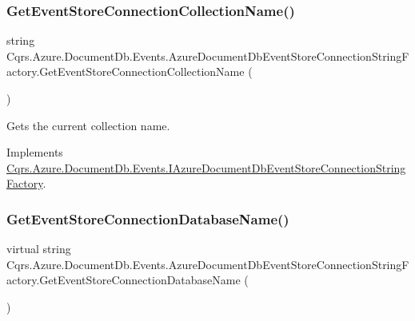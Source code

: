\subsubsection{\texorpdfstring{Get\+Event\+Store\+Connection\+Collection\+Name()}{GetEventStoreConnectionCollectionName()}}
{\footnotesize\ttfamily string Cqrs.\+Azure.\+Document\+Db.\+Events.\+Azure\+Document\+Db\+Event\+Store\+Connection\+String\+Factory.\+Get\+Event\+Store\+Connection\+Collection\+Name (\begin{DoxyParamCaption}{ }\end{DoxyParamCaption})}



Gets the current collection name. 



Implements \hyperlink{interfaceCqrs_1_1Azure_1_1DocumentDb_1_1Events_1_1IAzureDocumentDbEventStoreConnectionStringFactory_a4268ad0884bad88528a5eb10292d9d3b_a4268ad0884bad88528a5eb10292d9d3b}{Cqrs.\+Azure.\+Document\+Db.\+Events.\+I\+Azure\+Document\+Db\+Event\+Store\+Connection\+String\+Factory}.

\mbox{\label{classCqrs_1_1Azure_1_1DocumentDb_1_1Events_1_1AzureDocumentDbEventStoreConnectionStringFactory_af243f79315140e1f2c20a5c1695f4fb9_af243f79315140e1f2c20a5c1695f4fb9}} 
\subsubsection{\texorpdfstring{Get\+Event\+Store\+Connection\+Database\+Name()}{GetEventStoreConnectionDatabaseName()}}
{\footnotesize\ttfamily virtual string Cqrs.\+Azure.\+Document\+Db.\+Events.\+Azure\+Document\+Db\+Event\+Store\+Connection\+String\+Factory.\+Get\+Event\+Store\+Connection\+Database\+Name (\begin{DoxyParamCaption}{ }\end{DoxyParamCaption})\hspace{0.3cm}{\ttfamily [virtual]}}



